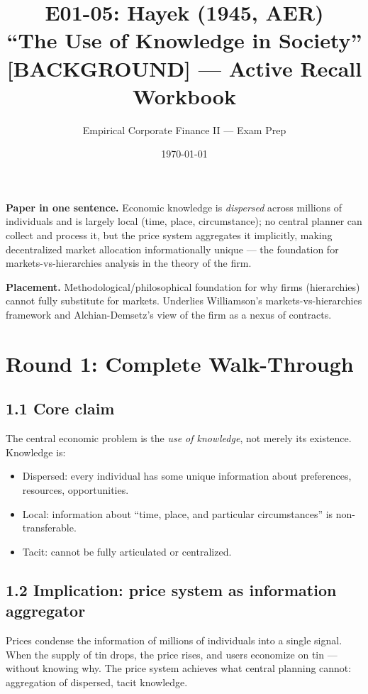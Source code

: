 \documentclass[11pt]{article}
\title{E01-05: Hayek (1945, AER) \\
\large ``The Use of Knowledge in Society'' [BACKGROUND] --- Active Recall Workbook}
\author{Empirical Corporate Finance II --- Exam Prep}
\date{\today}
\begin{document}
\maketitle

\begin{keybox}
\textbf{Paper in one sentence.} Economic knowledge is \emph{dispersed} across millions of individuals and is largely local (time, place, circumstance); no central planner can collect and process it, but the price system aggregates it implicitly, making decentralized market allocation informationally unique --- the foundation for markets-vs-hierarchies analysis in the theory of the firm.

\textbf{Placement.} Methodological/philosophical foundation for why firms (hierarchies) cannot fully substitute for markets. Underlies Williamson's markets-vs-hierarchies framework and Alchian-Demsetz's view of the firm as a nexus of contracts.
\end{keybox}

\section*{Round 1: Complete Walk-Through}

\subsection*{1.1 Core claim}
The central economic problem is the \emph{use of knowledge}, not merely its existence. Knowledge is:
\begin{itemize}
\item Dispersed: every individual has some unique information about preferences, resources, opportunities.
\item Local: information about ``time, place, and particular circumstances'' is non-transferable.
\item Tacit: cannot be fully articulated or centralized.
\end{itemize}

\subsection*{1.2 Implication: price system as information aggregator}
Prices condense the information of millions of individuals into a single signal. When the supply of tin drops, the price rises, and users economize on tin --- without knowing why. The price system achieves what central planning cannot: aggregation of dispersed, tacit knowledge.
\end{document}
